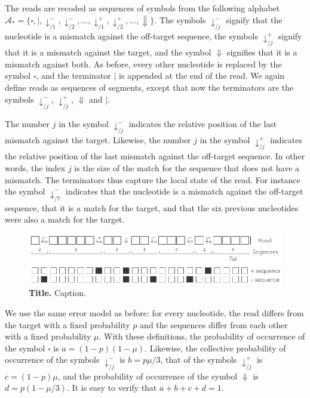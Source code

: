 \documentclass{article}
\begin{document}
The reads are recoded as sequences of symbols from the following alphabet
$\mathcal{A}_* = \{\square, |, \downarrow_{/1}^-, \downarrow_{/2}^-,
\ldots, \downarrow_{/1}^+, \downarrow_{/2}^+, \ldots, \Downarrow\}$. The
symbols $\downarrow_{/j}^-$ signify that the nucleotide is a mismatch
against the off-target sequence, the symbols $\downarrow_{/j}^+$ signify
that it is a mismatch against the target, and the symbol $\Downarrow$
signifies that it is a mismatch against both. As before, every other
nucleotide is replaced by the symbol $\square$, and the terminator $|$
is appended at the end of the read. We again define reads as sequences of
segments, except that now the terminators are the symbols
$\downarrow_{/j}^-$, $\downarrow_{/j}^+$, $\Downarrow$ and $|$.

The number $j$ in the symbol $\downarrow_{/j}^-$ indicates the relative
position of the last mismatch against the target. Likewise, the number $j$
in the symbol $\downarrow_{/j}^+$ indicates the relative position of the
last mismatch against the off-target sequence. In other words, the index
$j$ is the size of the match for the sequence that does not have a
mismatch. The terminators thus capture the local state of the read. For
instance the symbol $\downarrow_{/7}^-$ indicates that the nucleotide is a
mismatch against the off-target sequence, that it is a match for the
target, and that the six previous nucleotides were also a match for the
target.

\begin{figure}[h]
\centering
\includegraphics[scale=0.88]{sketch_dual.pdf}
\caption{\textbf{Title.}
Caption.}
\label{fig:dual}
\end{figure}

We use the same error model as before: for every nucleotide, the read
differs from the target with a fixed probability $p$ and the sequences
differ from each other with a fixed probability $\mu$. With these
definitions, the probability of occurrence of the symbol $\square$ is $a =
(1-p)(1-\mu)$. Likewise, the collective probability of occurrence of the
symbols $\downarrow_{/j}^-$ is $b = p\mu/3$, that of the symbols 
$\downarrow_{/j}^+$ is $c = (1-p)\mu$, and the probability of occurrence
of the symbol $\Downarrow$ is $d = p(1-\mu/3)$. It is easy to verify that
$a+b+c+d=1$.
\end{document}
